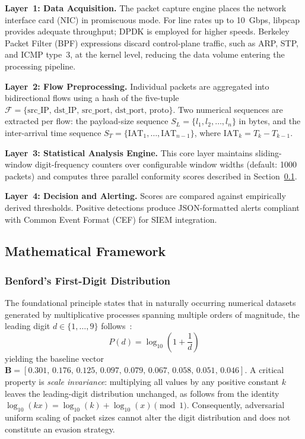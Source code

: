 \documentclass[conference]{IEEEtran}
\begin{document}
\textbf{Layer~1: Data Acquisition.} The packet capture engine places the
network interface card (NIC) in promiscuous mode. For line rates up to
10~Gbps, libpcap provides adequate throughput; DPDK is employed for higher
speeds. Berkeley Packet Filter (BPF) expressions discard control-plane
traffic, such as ARP, STP, and ICMP type~3, at the kernel level, reducing
the data volume entering the processing pipeline.

\textbf{Layer~2: Flow Preprocessing.} Individual packets are aggregated into
bidirectional flows using a hash of the five-tuple
$\mathcal{F} = \{\text{src\_IP},\, \text{dst\_IP},\, \text{src\_port},\,
\text{dst\_port},\, \text{proto}\}$.
Two numerical sequences are extracted per flow: the payload-size sequence
$S_L = \{l_1, l_2, \ldots, l_n\}$ in bytes, and the inter-arrival time
sequence $S_T = \{\text{IAT}_1, \ldots, \text{IAT}_{n-1}\}$, where
$\text{IAT}_k = T_k - T_{k-1}$.

\textbf{Layer~3: Statistical Analysis Engine.} This core layer maintains
sliding-window digit-frequency counters over configurable window widths
(default: 1000 packets) and computes three parallel conformity scores
described in Section~\ref{sec:math}.

\textbf{Layer~4: Decision and Alerting.} Scores are compared against
empirically derived thresholds. Positive detections produce JSON-formatted
alerts compliant with Common Event Format (CEF) for SIEM integration.

\subsection{Mathematical Framework}
\label{sec:math}

\subsubsection{Benford's First-Digit Distribution}

The foundational principle states that in naturally occurring numerical
datasets generated by multiplicative processes spanning multiple orders of
magnitude, the leading digit $d \in \{1,\ldots,9\}$ follows~\cite{b4,b5}:
\begin{equation}
  P(d) = \log_{10}\!\left(1 + \frac{1}{d}\right)
  \label{eq:benford}
\end{equation}
yielding the baseline vector
$\mathbf{B} = [0.301,\, 0.176,\, 0.125,\, 0.097,\, 0.079,\, 0.067,\,
0.058,\, 0.051,\, 0.046]$.
A critical property is \textit{scale invariance}: multiplying all values by
any positive constant $k$ leaves the leading-digit distribution unchanged,
as follows from the identity
$\log_{10}(kx) = \log_{10}(k) + \log_{10}(x) \pmod{1}$.
Consequently, adversarial uniform scaling of packet sizes cannot alter the
digit distribution and does not constitute an evasion strategy.
\end{document}
